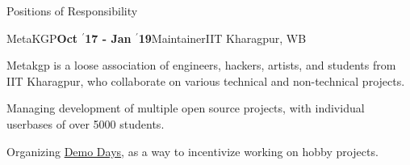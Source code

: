 \documentclass{resume} %
\begin{document}
\begin{rSection}{Positions of Responsibility}

\begin{rSubsection}{\large MetaKGP}{\textbf{\large Oct $^{\prime}$17 - Jan $^{\prime}$19}}{Maintainer}{IIT Kharagpur, WB}
\item Metakgp is a loose association of engineers, hackers, artists, and students from IIT Kharagpur, who collaborate on various technical and non-technical projects.
\item Managing development of multiple open source projects, with individual userbases of over 5000 students.
\item Organizing \href{https://www.youtube.com/watch?v=srH_yJJFK80&list=PLxBVN59ffbfKmADdIpkNCs4jfxJ-Nyhqx}{Demo Days}, as a way to incentivize working on hobby projects.
\end{rSubsection}





\end{rSection}
\end{document}
